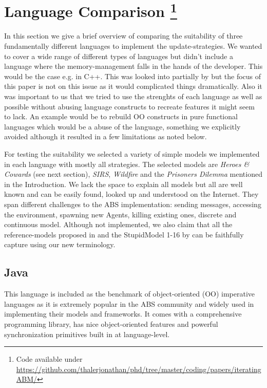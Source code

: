 \section[Language Comparison]{Language Comparison \footnote{Code available under\\ \url{https://github.com/thalerjonathan/phd/tree/master/coding/papers/iteratingABM/}}}
In this section we give a brief overview of comparing the suitability of three fundamentally different languages to implement the update-strategies. We wanted to cover a wide range of different types of languages but didn't include a language where the memory-management falls in the hands of the developer. This would be the case e.g. in C++. This was looked into partially by \cite{dawson_opening_2014} but the focus of this paper is not on this issue as it would complicated things dramatically. Also it was important to us that we tried to use the strenghts of each language as well as possible without abusing language constructs to recreate features it might seem to lack. An example would be to rebuild OO constructs in pure functional languages which would be a abuse of the language, something we explicitly avoided although it resulted in a few limitations as noted below.

For testing the suitability we selected a variety of simple models we implemented in each language with mostly all strategies. The selected models are \textit{Heroes \& Cowards} (see next section), \textit{SIRS}, \textit{Wildfire} and the \textit{Prisoners Dilemma} mentioned in the Introduction. We lack the space to explain all models but all are well known and can be easily found, looked up and understood on the Internet. They span different challenges to the ABS implementation: sending messages, accessing the environment, spawning new Agents, killing existing ones, discrete and continuous model. Although not implemented, we also claim that all the reference-models proposed in \cite{isaac_abm_2011} and the StupidModel 1-16 by \cite{railsback_stupidmodel_2005} can be faithfully capture using our new terminology.


\subsection{Java}
This language is included as the benchmark of object-oriented (OO) imperative languages as it is extremely popular in the ABS community and widely used in implementing their models and frameworks. It comes with a comprehensive programming library, has nice object-oriented features and powerful synchronization primitives built in at language-level.


